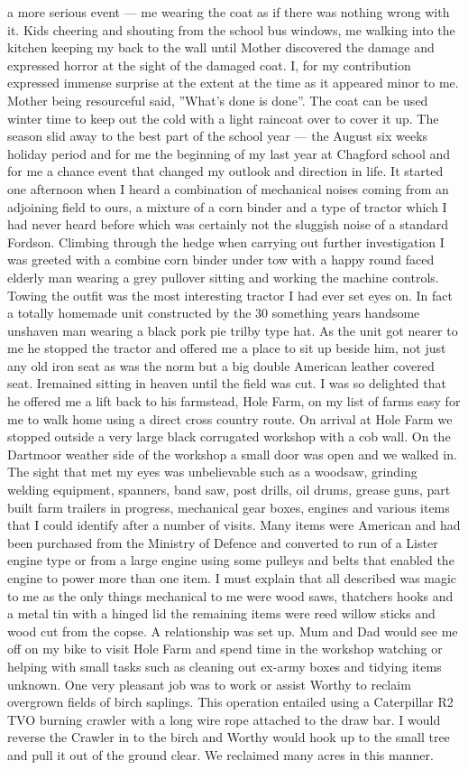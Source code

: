a more serious event --- me wearing the coat as if there was nothing wrong with
it. Kids cheering and shouting from the school bus windows, me walking into the
kitchen keeping my back to the wall until Mother discovered the damage and
expressed horror at the sight of the damaged coat.  I, for my contribution
expressed immense surprise at the extent at the time as it appeared minor to
me.  Mother being resourceful said, ''What's done is done''. The coat can be
used winter time to keep out the cold with a light raincoat over to cover it
up.  The season slid away to the best part of the school year --- the August
six weeks holiday period and for me the beginning of my last year at Chagford
school and for me a chance event that changed my outlook and direction in life.
It started one afternoon when I heard a combination of mechanical noises coming
from an adjoining field to ours, a mixture of a corn binder and a type of
tractor which I had never heard before which was certainly not the sluggish
noise of a standard Fordson.  Climbing through the hedge when carrying out
further investigation I was greeted with a combine corn binder under tow with a
happy round faced elderly man wearing a grey pullover sitting and working the
machine controls.  Towing the outfit was the most interesting tractor I had
ever set eyes on.  In fact a totally homemade unit constructed by the 30
something years handsome unshaven man wearing a black pork pie trilby type hat.
As the unit got nearer to me he stopped the tractor and offered me a place to
sit up beside him, not just any old iron seat as was the norm but a big double
American leather covered seat. Iremained sitting in heaven until the field was
cut.  I was so delighted that he offered me a lift back to his farmstead, Hole
Farm, on my list of farms easy for me to walk home using a direct cross country
route.  On arrival at Hole Farm we stopped outside a very large black
corrugated workshop with a cob wall. On the Dartmoor weather side of the
workshop a small door was open and we walked in. The sight that met my eyes was
unbelievable such as a woodsaw, grinding welding equipment, spanners, band saw,
post drills, oil drums, grease guns, part built farm trailers in progress,
mechanical gear boxes, engines and various items that I could identify after a
number of visits.  Many items were American and had been purchased from the
Ministry of Defence and converted to run of a Lister engine type or from a
large engine using some pulleys and belts that enabled the engine to power more
than one item.  I must explain that all described was magic to me as the only
things  mechanical to me were wood saws, thatchers hooks and a metal tin with a
hinged lid the remaining items were reed willow sticks and wood cut from the
copse. A relationship was set up.  Mum and Dad would see me off on my bike to
visit Hole Farm and spend time in the workshop watching or helping with small
tasks such as cleaning out ex-army boxes and tidying items unknown.  One very
pleasant job was to work or assist Worthy to reclaim overgrown fields of birch
saplings.  This operation entailed using a Caterpillar R2 TVO burning crawler
with a long wire rope attached to the draw bar.  I would reverse the Crawler in
to the birch and Worthy would hook up to the small tree and pull it out of the
ground clear. We reclaimed many acres in this manner.
